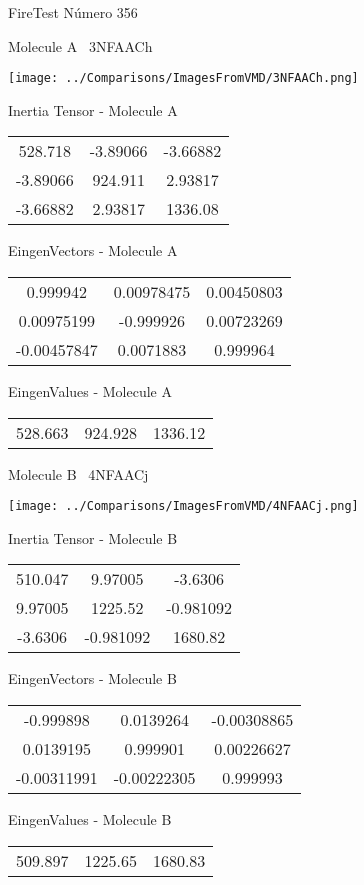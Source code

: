 \vtab[-3cm]
\begin{center}
{\large FireTest \tab Número 356}
\end{center}
\begin{multicols}{2}
\begin{center}

Molecule A \
3NFAACh

\texttt{[image: ../Comparisons/ImagesFromVMD/3NFAACh.png]}

Inertia Tensor - Molecule A \\
\begin{tabular}{|c c c|}
528.718	 & 	-3.89066	 & 	-3.66882	 \\
-3.89066	 & 	924.911	 & 	2.93817	 \\
-3.66882	 & 	2.93817	 & 	1336.08
\end{tabular}

\vtab
 EingenVectors - Molecule A     \\
\begin{tabular}{|c c c|}
0.999942	 & 	0.00978475	 & 	0.00450803	 \\
0.00975199	 & 	-0.999926	 & 	0.00723269	 \\
-0.00457847	 & 	0.0071883	 & 	0.999964
\end{tabular}

\vtab
 EingenValues - Molecule A     \\
\begin{tabular}{|c c c|}
528.663	 & 	924.928	 & 	1336.12	 \\
\end{tabular}
\columnbreak

Molecule B \
4NFAACj

\texttt{[image: ../Comparisons/ImagesFromVMD/4NFAACj.png]}

Inertia Tensor - Molecule B \\
\begin{tabular}{|c c c|}
510.047	 & 	9.97005	 & 	-3.6306	 \\
9.97005	 & 	1225.52	 & 	-0.981092	 \\
-3.6306	 & 	-0.981092	 & 	1680.82
\end{tabular}

\vtab
 EingenVectors - Molecule B     \\
\begin{tabular}{|c c c|}
-0.999898	 & 	0.0139264	 & 	-0.00308865	 \\
0.0139195	 & 	0.999901	 & 	0.00226627	 \\
-0.00311991	 & 	-0.00222305	 & 	0.999993
\end{tabular}

\vtab
 EingenValues - Molecule B     \\
\begin{tabular}{|c c c|}
509.897	 & 	1225.65	 & 	1680.83	 \\
\end{tabular}

\end{center}
\end{multicols}

